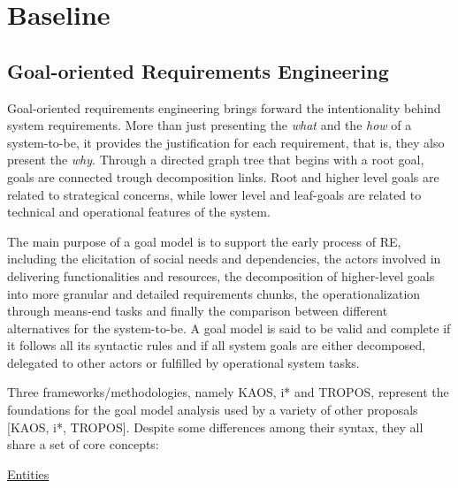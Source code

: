 \chapter{Baseline}\label{ch_baseline}%

\section{Goal-oriented Requirements Engineering}

Goal-oriented requirements engineering brings forward the intentionality behind system requirements. More than just presenting the \textit{what} and the \textit{how} of a system-to-be, it provides the justification for each requirement, that is, they also present the \textit{why}. Through a directed graph tree that begins with a root goal, goals are connected trough decomposition links. Root and higher level goals are related to strategical concerns, while lower level and leaf-goals are related to technical and operational features of the system. 

The main purpose of a goal model is to support the early process of RE, including the elicitation of social needs and dependencies, the actors involved in delivering functionalities and resources, the decomposition of higher-level goals into more granular and detailed requirements chunks, the operationalization through means-end tasks and finally the comparison between different alternatives for the system-to-be. A goal model is said to be valid and complete if it follows all its syntactic rules and if all system goals are either decomposed, delegated to other actors or fulfilled by operational system tasks. 

Three frameworks/methodologies, namely KAOS, i* and TROPOS, represent the foundations for the goal model analysis used by a variety of other proposals [KAOS, i*, TROPOS]. Despite some differences among their syntax, they all share a set of core concepts:
\medskip

\large{\underline{Entities}}

